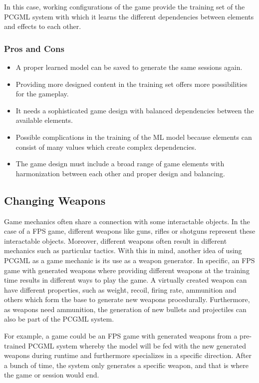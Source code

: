 \documentclass[MGS,Master,english]{twbook}%
\begin{document}
In this case, working configurations of the game provide the training set of the \ac{PCGML} system with which it learns the different dependencies between elements and effects to each other. 

\subsubsection{Pros and Cons}
\begin{itemize}
	\item A proper learned model can be saved to generate the same sessions again.
	\item Providing more designed content in the training set offers more possibilities for the gameplay.
	\item It needs a sophisticated game design with balanced dependencies between the available elements.
	\item Possible complications in the training of the \ac{ML} model because elements can consist of many values which create complex dependencies.
	\item The game design must include a broad range of game elements with harmonization between each other and proper design and balancing.
\end{itemize}

\subsection{Changing Weapons} \label{idea::changingWeapons}
Game mechanics often share a connection with some interactable objects. In the case of a \ac{FPS} game, different weapons like guns, rifles or shotguns represent these interactable objects. Moreover, different weapons often result in different mechanics such as particular tactics. With this in mind, another idea of using \ac{PCGML} as a game mechanic is its use as a weapon generator. In specific, an \ac{FPS} game with generated weapons where providing different weapons at the training time results in different ways to play the game. A virtually created weapon can have different properties, such as weight, recoil, firing rate, ammunition and others which form the base to generate new weapons procedurally. Furthermore, as weapons need ammunition, the generation of new bullets and projectiles can also be part of the \ac{PCGML} system. 

For example, a game could be an \ac{FPS} game with generated weapons from a pre-trained \ac{PCGML} system whereby the model will be fed with the new generated weapons during runtime and furthermore specializes in a specific direction. After a bunch of time, the system only generates a specific weapon, and that is where the game or session would end.
\end{document}
